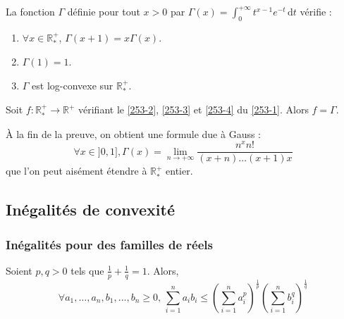 
  \begin{lemma}
    \label{253-1}
    La fonction $\Gamma$ définie pour tout $x > 0$ par $\Gamma(x) = \int_0^{+\infty} t^{x-1} e^{-t} \, \mathrm{d}t$ vérifie :
    \begin{enumerate}[label=(\roman*)]
      \item \label{253-2} $\forall x \in \mathbb{R}^+_*$, $\Gamma(x+1) = x\Gamma(x)$.
      \item \label{253-3} $\Gamma(1) = 1$.
      \item \label{253-4} $\Gamma$ est log-convexe sur $\mathbb{R}^+_*$.
    \end{enumerate}
  \end{lemma}


  \begin{theorem}
    Soit $f : \mathbb{R}^+_* \rightarrow \mathbb{R}^+$ vérifiant le \cref{253-2}, \cref{253-3} et \cref{253-4} du \cref{253-1}. Alors $f = \Gamma$.
  \end{theorem}

  \begin{remark}
    À la fin de la preuve, on obtient une formule due à Gauss :
    \[ \forall x \in ]0, 1], \Gamma(x) = \lim_{n \rightarrow +\infty} \frac{n^x n!}{(x+n) \dots (x+1)x} \]
    que l'on peut aisément étendre à $\mathbb{R}^+_*$ entier.
  \end{remark}

  \subsection{Inégalités de convexité}

  \subsubsection{Inégalités pour des familles de réels}


  \begin{proposition}
    Soient $p, q > 0$ tels que $\frac{1}{p} + \frac{1}{q} = 1$. Alors,
    \[ \forall a_1, \dots, a_n, b_1, \dots, b_n \geq 0, \, \sum_{i=1}^n a_i b_i \leq \left( \sum_{i=1}^n a_i^p \right)^{\frac{1}{p}} \left( \sum_{i=1}^n b_i^q \right)^{\frac{1}{q}} \]
  \end{proposition}

